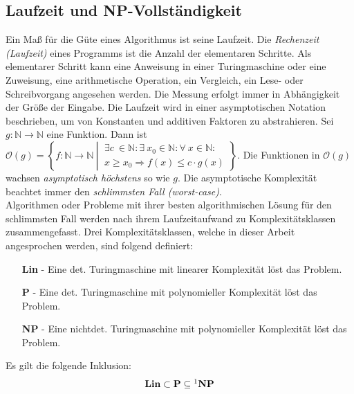 \subsection{Laufzeit und NP-Vollständigkeit}
Ein Maß für die Güte eines Algorithmus ist seine Laufzeit. Die \emph{Rechenzeit (Laufzeit)} eines Programms ist die Anzahl der elementaren Schritte. Als elementarer Schritt kann eine Anweisung in einer Turingmaschine \cite{turing} oder eine Zuweisung, eine arithmetische Operation, ein Vergleich, ein Lese- oder Schreibvorgang angesehen werden.\newline\newline
Die Messung erfolgt immer in Abhängigkeit der Größe der Eingabe. Die Laufzeit wird in einer asymptotischen Notation beschrieben, um von Konstanten und additiven Faktoren zu abstrahieren.
Sei $g: {{\mathbb N}} \rightarrow {{\mathbb N}}$ eine Funktion.\newline\newline
Dann ist $\mathcal{O}(g) = \left\{ f:{{\mathbb N}} \rightarrow {{\mathbb N}} ~\left|~
\begin{array}{l}
\exists c~ \in {{\mathbb N}} : \exists~ x_0 \in {{\mathbb N}} : \forall~ x \in {{\mathbb N}} : \\
x \geq x_0 \Rightarrow f(x) \leq c \cdot g(x)
\end{array} \right. \right\}$\cite{buchwanke}.\newline\newline
Die Funktionen in $\mathcal{O}(g)$ wachsen \emph{asymptotisch h\"ochstens} so wie $g$. Die asymptotische Komplexität beachtet immer den \emph{schlimmsten Fall (worst-case)}.\\
Algorithmen oder Probleme mit ihrer besten algorithmischen Lösung für den schlimmsten Fall werden nach ihrem Laufzeitaufwand zu Komplexitätsklassen zusammengefasst. Drei Komplexitätsklassen, welche in dieser Arbeit angesprochen werden, sind folgend definiert:
\begin{itemize}
\item[\textbf{Lin}]- Eine det. Turingmaschine mit linearer Komplexität löst das Problem.
\item[\textbf{P}]- Eine det. Turingmaschine mit polynomieller Komplexität löst das Problem.
\item[\textbf{NP}]- Eine nichtdet. Turingmaschine mit polynomieller Komplexität löst das Problem.
\end{itemize}
Es gilt die folgende Inklusion: $$\textbf{Lin}\subset\textbf{P}\subseteq\footnote{\text{Ob \textbf{P}=\textbf{NP} oder \textbf{P}$\neq$ \textbf{NP} ist Eines der größten noch offenen Probleme in der theoretischen Informatik}}\textbf{NP} $$
\newpage
